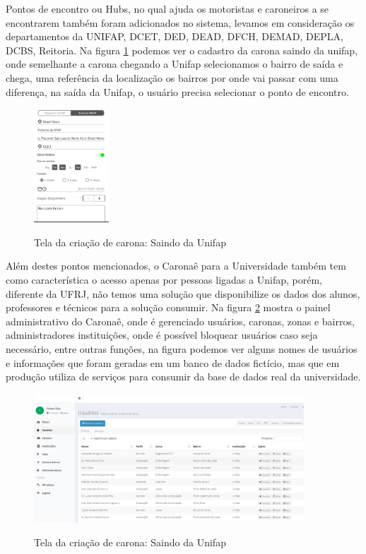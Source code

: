 Pontos de encontro ou Hubs, no qual ajuda os motoristas e caroneiros a se encontrarem também foram adicionados no sistema, levamos em consideração os departamentos da UNIFAP, DCET, DED, DEAD, DFCH, DEMAD, DEPLA, DCBS, Reitoria. Na figura \ref{fig:carona_saindo_da_unifap} podemos ver o cadastro da carona saindo da unifap, onde semelhante a carona chegando a Unifap selecionamos o bairro de saída e chega, uma referência da localização os bairros por onde vai passar com uma diferença, na saída da Unifap, o usuário precisa selecionar o ponto de encontro.

\begin{figure}[!hbtp]
	\centering
	\caption{Tela da criação de carona: Saindo da Unifap}
	\includegraphics[width=0.25\textwidth]{./04-figuras/caronae/tela_criacao_da_carona_de_saida_da_unifapp.png}
	\label{fig:carona_saindo_da_unifap}
\end{figure}

Além destes pontos mencionados, o Caronaê para a Universidade também tem como característica o acesso apenas por pessoas ligadas a Unifap, porém, diferente da UFRJ, não temos uma solução que disponibilize os dados dos alunos, professores e técnicos para a solução consumir. Na figura \ref{fig:tela_usuarios_painel_administrativo} mostra o painel administrativo do Caronaê, onde é gerenciado usuários, caronas, zonas e bairros, administradores instituições, onde é possível bloquear usuários caso seja necessário, entre outras funções, na figura podemos ver alguns nomes de usuários e informações que foram geradas em um banco de dados fictício, mas que em produção utiliza de serviços para consumir da base de dados real da universidade.

\begin{figure}[!hbtp]
	\centering
	\caption{Tela da criação de carona: Saindo da Unifap}
	\includegraphics[width=0.9\textwidth]{./04-figuras/caronae/tela_usuarios_do_painel_administrativo.png}
	\label{fig:tela_usuarios_painel_administrativo}
\end{figure}

